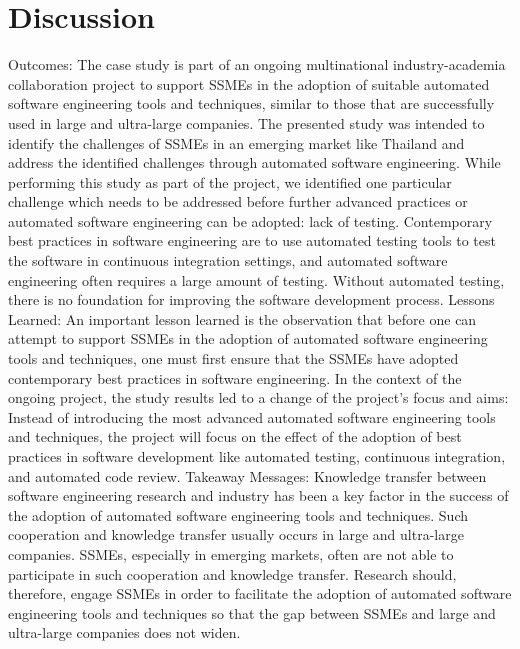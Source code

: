 \documentclass[conference]{IEEEtran}
\begin{document}
\section{Discussion}
Outcomes: The case study is part of an ongoing multinational industry-academia collaboration project to support
SSMEs in the adoption of suitable automated software engineering tools and techniques, similar to those that are
successfully used in large and ultra-large companies.
The presented study was intended to identify the challenges
of SSMEs in an emerging market like Thailand and address the
identified challenges through automated software engineering.
While performing this study as part of the project, we identified one particular challenge which needs to be addressed
before further advanced practices or automated software engineering can be adopted: lack of testing. Contemporary best
practices in software engineering are to use automated testing
tools to test the software in continuous integration settings, and
automated software engineering often requires a large amount
of testing. Without automated testing, there is no foundation
for improving the software development process.
Lessons Learned: An important lesson learned is the
observation that before one can attempt to support SSMEs
in the adoption of automated software engineering tools and
techniques, one must first ensure that the SSMEs have adopted
contemporary best practices in software engineering. In the
context of the ongoing project, the study results led to a
change of the project’s focus and aims: Instead of introducing
the most advanced automated software engineering tools and
techniques, the project will focus on the effect of the adoption
of best practices in software development like automated
testing, continuous integration, and automated code review.
Takeaway Messages: Knowledge transfer between software engineering research and industry has been a key factor in
the success of the adoption of automated software engineering
tools and techniques. Such cooperation and knowledge transfer
usually occurs in large and ultra-large companies. SSMEs, especially in emerging markets, often are not able to participate
in such cooperation and knowledge transfer. Research should,
therefore, engage SSMEs in order to facilitate the adoption of
automated software engineering tools and techniques so that
the gap between SSMEs and large and ultra-large companies
does not widen.
\end{document}

